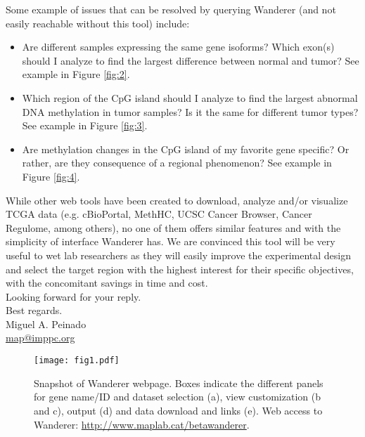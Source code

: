 \documentclass[a4paper,english]{article}
\begin{document}
Some example of issues that can be resolved by querying Wanderer (and not easily reachable without this tool) include:
\begin{itemize}
\item Are different samples expressing the same gene isoforms? Which exon(s) should I analyze to find the largest difference between normal and tumor? See example in Figure \ref{fig:2}.
\item Which region of the CpG island should I analyze to find the largest abnormal DNA methylation in tumor samples? Is it the same for different tumor types? See example in Figure \ref{fig:3}.
\item Are methylation changes in the CpG island of my favorite gene specific? Or rather, are they consequence of a regional phenomenon? See example in Figure \ref{fig:4}.
\end{itemize}


While other web tools have been created to download, analyze and/or visualize TCGA data (e.g. cBioPortal, MethHC, UCSC Cancer Browser, Cancer Regulome, among others), no one of them offers similar features and with the simplicity of interface Wanderer has. We are convinced this tool will be very useful to wet lab researchers as they will easily improve the experimental design and select the target region with the highest interest for their specific objectives, with the concomitant savings in time and cost.\\

Looking forward for your reply.\\

Best regards.\\


Miguel A. Peinado\\
\noindent \href{mailto:map@imppc.org}{map@imppc.org}




\begin{figure}[center]
  \centering
  \texttt{[image: fig1.pdf]}
  \caption{Snapshot of Wanderer webpage. Boxes indicate the different panels for gene name/ID and dataset selection (a), view customization (b and c), output (d) and data download and links (e). Web access to Wanderer: \href{http://www.maplab.cat/betawanderer}{http://www.maplab.cat/betawanderer}.}
  \label{fig:1}
\end{figure}
\end{document}

